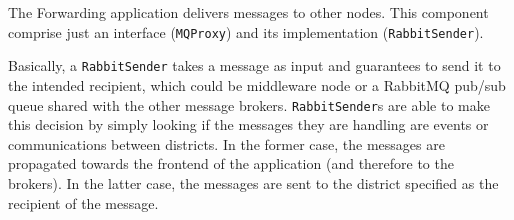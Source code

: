 The Forwarding application delivers messages to other nodes. This component
comprise just an interface (\texttt{MQProxy}) and its
implementation (\texttt{RabbitSender}).

Basically, a \texttt{RabbitSender} takes a message as input and guarantees to
send it to the intended recipient, which could be middleware node or a
RabbitMQ pub/sub queue shared with the other message brokers.
\texttt{RabbitSender}s are able to make this decision by simply looking if the
messages they are handling are events or communications between districts.
In the former case, the messages are propagated towards the frontend of the
application (and therefore to the brokers). In the latter case, the messages are
sent to the district specified as the recipient of the message.
